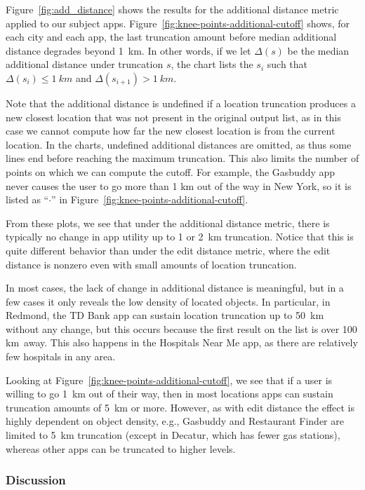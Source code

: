 Figure~\ref{fig:add_distance} shows the results for the additional
distance metric applied to our subject apps.
Figure~\ref{fig:knee-points-additional-cutoff} shows, for each city
and each app, the last truncation amount before median additional
distance degrades beyond 1~km. In other words, if we let
$\Delta(s)$ be the
median additional distance under truncation $s$, the chart lists
the $s_i$ such that $\Delta(s_i) \leq 1~km$ and $\Delta(s_{i+1}) >
1~km$.

Note that the additional distance is undefined if a location
truncation produces a new closest location that was not present in the
original output list, as in this case we cannot compute how far the
new closest location is from the current location. In the charts,
undefined additional distances are omitted, as thus some lines end
before reaching the maximum truncation. This also limits the number of
points on which we can compute the cutoff.  For example, the Gasbuddy
app never causes the user to go more than 1 km out of the way in New York, 
so it is listed as ``$\cdot$'' in Figure~\ref{fig:knee-points-additional-cutoff}.

From these plots, we see that under the additional distance
metric, there is typically no change in app utility up to 1 or 2~km
truncation. Notice that this is
quite different behavior than under the edit distance metric,
where the edit distance is nonzero even with small amounts of 
location truncation.

In most cases, the lack of change in additional distance is
meaningful, but in a few cases it only reveals the low density of
located objects. In particular, in Redmond, the TD Bank app can
sustain location truncation up to 50~km without any change, but
this occurs because the first result on the list is over 100 km~away. This
also happens in the Hospitals Near Me app, as there are relatively few
hospitals in any area.

Looking at Figure~\ref{fig:knee-points-additional-cutoff}, we see that
if a user is willing to go 1~km out of their way, then in most
locations apps can sustain truncation amounts of 5~km or
more. However, as with edit distance the effect is highly dependent on
object density, e.g., Gasbuddy and Restaurant Finder are limited to 5~km
truncation (except in Decatur, which has fewer gas
stations), whereas other apps can be truncated to higher levels.

\subsubsection{Discussion}

